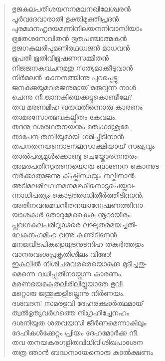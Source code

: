 \begin{verse}
ഭുജകുലപതിശയനനമലനഖിലേശ്വരന്‍\\
പൂര്‍വദേവാരാതി ഭുക്തിമുക്തിപ്രദന്‍\\
പുരമഥനഹൃദയമണിനിലയനനിവാസിയാം\\
ഭൂതേശസേവിതന്‍ ഭൂതപഞ്ചാത്മകന്‍\\
ഭുജഗകുലരിപുമണിരഥധ്വജന്‍ മാധവന്‍\\
ഭൂപതി ഭൂതിവിഭൂഷണസമ്മിതന്‍\\
നിജജനകവചനമതു സത്യമാക്കീടുവാന്‍\\
നിര്‍മലന്‍ കാനനത്തിന്നു പുറപ്പെട്ടു\\
ജനകജയുമവരജനുമായ് മരുവുന്ന നാള്‍\\
ചെന്നു നീ ജാനകിയെക്കട്ടുകൊണ്ടീലേ?\\
തവ മരണമിഹ വരുവതിന്നൊരു കാരണം\\
താമരസോത്ഭവകല്പിതം കേവലം.\\
തദനു ദശരഥതനയനും മതംഗാശ്രമേ\\
താപേന തമ്പിയുമായ് ഗമിച്ചീടിനാന്‍\\
തപനതനയനൊടനലസാക്ഷിയായ് സഖ്യവും\\
താല്‍പര്യമുള്‍ക്കൊണ്ടു ചെയ്തോരനന്തരം\\
അമരപതിസുതനെയൊരു ബാണേന കൊന്നുട-\\
നര്‍ക്കാത്മജന്നു കിഷ്കിന്ധയും നല്കിനാന്‍.\\
അടിമലരിലവനമനമഴകിനൊടുചെയ്തവ-\\
ന്നാധിപത്യം കൊടുത്താധിതീര്‍ത്തീടിനാന്‍.\\
അതിനവനുമവനിതനയാന്വേഷണത്തിനാ-\\
യാശകള്‍ തോറുമേകൈക നൂറായിരം\\
പ്ലവഗകുലപരിവൃഢരെ ലഘുതരമയച്ചതി-\\
ലേകനഹമിഹ വന്നു കണ്ടീടിനേന്‍.\\
മനജവിടപികളെയുടനുടനിഹ തകര്‍ത്തതും\\
വാനരവംശപ്രകൃതിശീലം വിഭോ!\\
ഇകലില്‍ നിശിചരവരരെയൊക്കെ മുടിച്ചതു-\\
മെന്നെ വധിപ്പതിനായ്വന്ന കാരണം.\\
മരണഭയമകതലിരിലില്ലയാതേ ഭുവി\\
മറ്റൊരു ജന്തുക്കളില്ലെന്നു നിര്‍ണയം.\\
ദശവദന! സമരഭുവി ദേഹരക്ഷാര്‍ത്ഥമായ്\\
ത്വല്‍ഭൃത്യവര്‍ഗത്തെ നിഗ്രഹിച്ചേനഹം\\
ദശനിയുത ശതവയസി ജീര്‍ണമെന്നാകിലും\\
ദേഹികള്‍ക്കേറ്റം പ്രിയം ദേഹമോര്‍ക്ക നീ.\\
തവ തനയകരഗളിതവിധിവിശിഖപാശേന\\
തത്ര ഞാന്‍ ബദ്ധനായേനൊരു കാല്‍ക്ഷണം\\

\end{verse}
